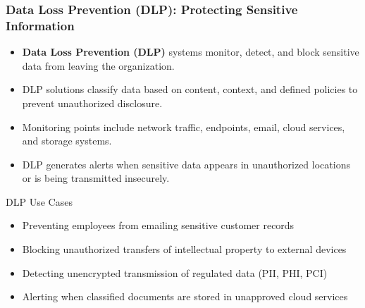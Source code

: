 \documentclass{beamer}
\begin{document}
\begin{frame}
\frametitle{Data Loss Prevention (DLP): Protecting Sensitive Information}
\begin{itemize}
\item \textbf{Data Loss Prevention (DLP)} systems monitor, detect, and block sensitive data from leaving the organization.
\item DLP solutions classify data based on content, context, and defined policies to prevent unauthorized disclosure.
\item Monitoring points include network traffic, endpoints, email, cloud services, and storage systems.
\item DLP generates alerts when sensitive data appears in unauthorized locations or is being transmitted insecurely.
\end{itemize}

\begin{exampleblock}{DLP Use Cases}
    \scriptsize
\begin{itemize}
\item Preventing employees from emailing sensitive customer records
\item Blocking unauthorized transfers of intellectual property to external devices
\item Detecting unencrypted transmission of regulated data (PII, PHI, PCI)
\item Alerting when classified documents are stored in unapproved cloud services
\end{itemize}
\end{exampleblock}
\end{frame}
\end{document}
